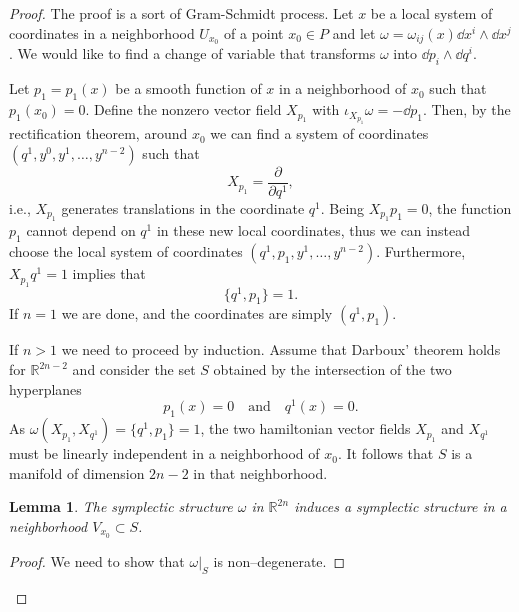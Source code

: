 \documentclass[english,fontsize=11pt,paper=b5]{scrbook}
\newtheorem{lemma}[theorem]{Lemma}
\theoremstyle{definition}
\begin{document}
    \begin{proof}
      The proof is a sort of Gram-Schmidt process.
      Let $x$ be a local system of coordinates in a neighborhood $U_{x_0}$ of a point $x_0\in P$ and let $\omega = \omega_{ij}(x)\dd x^i\wedge \dd x^j$.
      We would like to find a change of variable that transforms $\omega$ into $\dd p_i \wedge \dd q^i$.

      Let $p_1=p_1(x)$ be a smooth function of $x$ in a neighborhood of $x_0$ such that $p_1(x_0) = 0$.
      Define the nonzero vector field $X_{p_1}$ with $\iota_{X_{p_1}}\omega = -\dd p_1$.
      Then, by the rectification theorem, around $x_0$ we can find a system of coordinates $(q^1, y^0, y^1, \ldots, y^{n-2})$ such that
      \begin{equation}
        X_{p_1} = \frac{\partial}{\partial q^1},
      \end{equation}
      i.e., $X_{p_1}$ generates translations in the coordinate $q^1$.
      Being $X_{p_1} p_1 = 0$, the function $p_1$ cannot depend on $q^1$ in these new local coordinates, thus we can instead choose the local system of coordinates $(q^1, p_1, y^1, \ldots, y^{n-2})$.
      Furthermore, $X_{p_1} q^1 = 1$ implies that
      \begin{equation}
        \big\{q^1, p_1\big\} = 1.
      \end{equation}
      If $n=1$ we are done, and the coordinates are simply $(q^1, p_1)$.

      If $n>1$ we need to proceed by induction.
      Assume that Darboux' theorem holds for $\mathbb{R}^{2n-2}$ and consider the set $S$ obtained by the intersection of the two hyperplanes
      \begin{equation}
        p_1(x) = 0 \quad\mbox{and}\quad q^1(x) = 0.
      \end{equation}
      As $\omega(X_{p_1}, X_{q^1}) = \big\{q^1, p_1\big\} = 1$, the two hamiltonian vector fields $X_{p_1}$ and $X_{q^1}$ must be linearly independent in a neighborhood of $x_0$. It follows that $S$ is a manifold of dimension $2n-2$ in that neighborhood.

      \begin{lemma}
        The symplectic structure $\omega$ in $\mathbb{R}^{2n}$ induces a symplectic structure in a neighborhood $V_{x_0}\subset S$.
      \end{lemma}
      \begin{proof}
        We need to show that $\omega|_S$ is non--degenerate.


\end{proof}
\end{proof}
\end{document}
